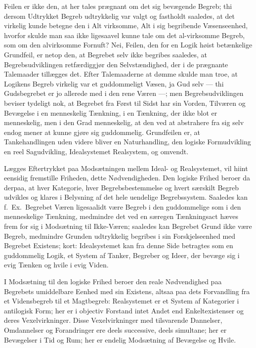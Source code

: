 \documentclass[12pt]{book}
\newcommand{\opage}[1]{\marginnote{\footnotesize\textit{[#1]}}}
\begin{document}
Feilen er ikke den, at her tales prægnant om det sig bevægende Begreb; thi dersom Udtrykket Begreb
udtrykkelig var valgt og fastholdt saaledes, at det virkelig kunde betegne den i Alt virksomme, Alt
i sig begribende Væsenseenhed, hvorfor skulde man saa ikke ligesaavel kunne tale om det
al-virksomme Begreb, som om den alvirksomme Fornuft? Nei, Feilen, den for en Logik høist
betænkelige Grundfeil, er netop
\opage{227} den, at Begrebet selv ikke begribes saaledes, at Begrebsudviklingen retfærdiggjør den
Selvstændighed, der i de prægnante Talemaader tillægges det. Efter Talemaaderne at dømme skulde man
troe, at Logikens Begreb virkelig var et guddommeligt Væsen, ja Gud selv --- thi Gudsbegrebet er jo
allerede med i den rene Væren ---; men Begrebsudviklingen beviser tydeligt nok, at Begrebet fra
Først til Sidst har sin Vorden, Tilværen og Bevægelse i en menneskelig Tænkning, i en Tænkning, der
ikke blot er menneskelig, men i den Grad menneskelig, at den ved at abstrahere fra sig selv endog
mener at kunne gjøre sig guddommelig. Grundfeilen er, at Tankehandlingen uden videre bliver en
Naturhandling, den logiske Formudvikling en reel Sagudvikling, Idealsystemet Realsystem, og
omvendt.

Lægges Eftertrykket paa Modsætningen mellem Ideal- og Realsystemet, vil hiint eensidig fremstille
Friheden, dette Nødvendigheden. Den logiske Frihed beroer da derpaa, at hver Kategorie, hver
Begrebsbestemmelse og hvert særskilt Begreb udvikles og klares i Belysning af det hele uendelige
Begrebssystem. Saaledes kan f.\ Ex.\ Begrebet Væren ligesaalidt være Begreb i den guddommelige som
i den menneskelige Tænkning, medmindre det ved en særegen Tænkningsact hæves frem for sig i
Modsætning til Ikke-Væren; saaledes kan Begrebet Grund ikke være Begreb, medmindre Grunden
udtrykkelig begribes i sin Forskjelseenhed med Begrebet Existens; kort: Idealsystemet kan fra denne
Side betragtes som en guddommelig Logik, et System af Tanker, Begreber og Ideer, der bevæge sig i
evig Tænken og hvile i evig Viden.

I Modsætning til den logiske Frihed beroer den reale Nødvendighed paa Begrebets umiddelbare Eenhed
med sin Existens, altsaa paa dets Forvandling fra et Vidensbegreb til et Magtbegreb: Realsystemet
er et System af Kategorier i antilogisk Form; her er i objectiv Forstand intet Andet end
\opage{228} Enkeltexistenser og deres Vexelvirkninger. Disse Vexelvirkninger med tilsvarende Dannelser,
Omdannelser og Forandringer ere deels successive, deels simultane; her er Bevægelser i Tid og Rum;
her er endelig Modsætning af Bevægelse og Hvile.
\end{document}
